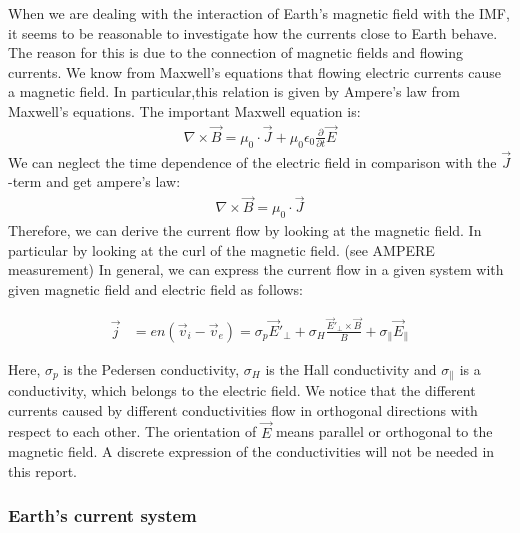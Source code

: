 \documentclass[10pt,a4paper]{article}
\begin{document}
When we are dealing with the interaction of Earth's magnetic field with the IMF, it seems to be reasonable to investigate how the currents close to Earth behave.
The reason for this is due to the connection of magnetic fields and flowing currents. We know from Maxwell's equations that flowing electric currents cause a magnetic field. In particular,this relation is given by Ampere's law from Maxwell's equations. The important Maxwell equation is:
\begin{align}
\nabla \times \vec{B}= \mu_0 \cdot \vec{J} + \mu_0 \epsilon_0 \frac{\partial }{\partial t} \vec{E}
\end{align}
We can neglect the time dependence of the electric field in comparison with the $\vec{J}$-term and get ampere's law:
\begin{align}
\nabla \times \vec{B}= \mu_0 \cdot \vec{J}
\end{align}
Therefore, we can derive the current flow by looking at the magnetic field. In particular by looking at the curl of the magnetic field. (see AMPERE measurement)
In general, we can express the current flow in a given system with given magnetic field and electric field as follows:

\begin{align}
\vec{j}&= e n ( \vec{v}_i - \vec{v}_e ) = \sigma_p \vec{E}'_{\perp} + \sigma_H \frac{\vec{E}'_{\perp} \times \vec{B}}{B} + \sigma_{\parallel} \vec{E}_{\parallel}
\end{align}

Here, $\sigma_p$ is the Pedersen conductivity, $\sigma_H$ is the Hall conductivity and $\sigma_{\parallel}$ is a conductivity, which belongs to 
the electric field. We notice that the different currents caused by different conductivities flow in orthogonal directions with respect to each other. The orientation of $\vec{E}$ means parallel or orthogonal to the magnetic field. A discrete expression of the conductivities will not be needed in this report.

\subsubsection{Earth's current system \label{_CHAP_THEO_currentsystem earth}}
\end{document}

